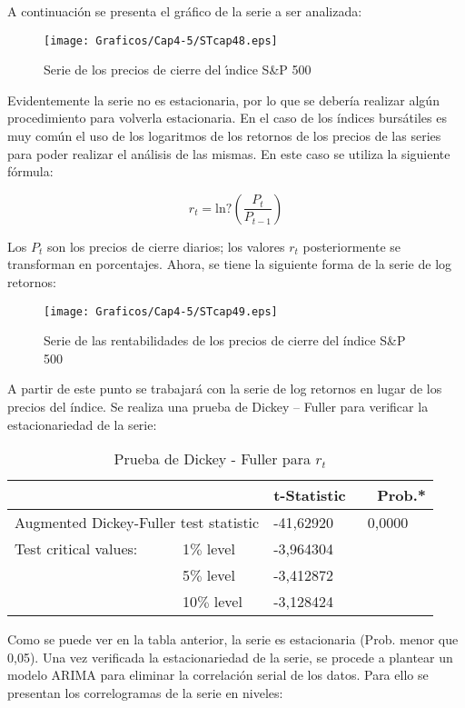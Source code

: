 A continuaci\'{o}n se presenta el gr\'{a}fico de la serie a ser analizada:

\begin{figure}[H]
\centering
\texttt{[image: Graficos/Cap4-5/STcap48.eps]}
\caption{Serie de los precios de cierre del \'{\i}ndice S{\&}P 500}
\end{figure}

Evidentemente la serie no es estacionaria, por lo que se deber\'{i}a realizar alg\'{u}n procedimiento para volverla estacionaria. En el caso de los \'{i}ndices burs\'{a}tiles es muy com\'{u}n el uso de los logaritmos de los retornos de los precios de las series para poder realizar el an\'{a}lisis de las mismas. En este caso se utiliza la siguiente f\'{o}rmula:

\[
r_{t}=\mathrm{ln?}\left( \frac{P_{t}}{P_{t-1}} \right)
\]

Los $P_{t}$ son los precios de cierre diarios; los valores $r_{t}$ posteriormente se transforman en porcentajes. Ahora, se tiene la siguiente forma de la serie de log retornos:

\begin{figure}[H]
\centering
\texttt{[image: Graficos/Cap4-5/STcap49.eps]}
\caption{Serie de las rentabilidades de los precios de cierre del \'{i}ndice S{\&}P 500}
\end{figure}

A partir de este punto se trabajar\'{a} con la serie de log retornos en lugar de los precios del \'{i}ndice. Se realiza una prueba de Dickey -- Fuller para verificar la estacionariedad de la serie:

\begin{table}[H]
\centering
\begin{tabular}{p{110pt}p{70pt}ll}\hline\hline
& & t-Statistic & ~~Prob.* \\ \hline \hline
\multicolumn{2}{l}{Augmented Dickey-Fuller test statistic} & -41,62920 & ~0,0000 \\ \hline
Test critical values: & 1$\%$ level & -3,964304 & \\
& 5$\%$ level & -3,412872 & \\
& 10$\%$ level & -3,128424 & \\ \hline \hline
\end{tabular}
\caption{Prueba de Dickey - Fuller para $r_t$}
\end{table}

Como se puede ver en la tabla anterior, la serie es estacionaria (Prob. menor que 0,05). Una vez verificada la estacionariedad de la serie, se procede a plantear un modelo ARIMA para eliminar la correlaci\'{o}n serial de los datos. Para ello se presentan los correlogramas de la serie en niveles:

